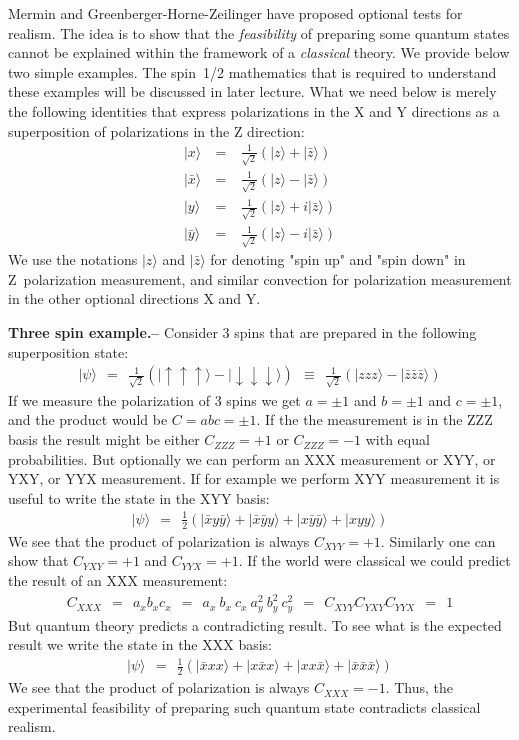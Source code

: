 \documentclass[onecolumn,fleqn, 11pt]{revtex4}
\newcommand{\beq}{\begin{eqnarray}}
\newcommand{\eeq}{\end{eqnarray}}
\begin{document}
Mermin and Greenberger-Horne-Zeilinger have proposed optional tests for realism.
The idea is to show that the {\em feasibility} of preparing some quantum states 
cannot be explained within the framework of a {\em classical} theory.
We provide below two simple examples. The spin~1/2 mathematics that is required 
to understand these examples will be discussed in later lecture. What we need 
below is merely the following identities that express polarizations 
in the X and Y directions as a superposition of polarizations in the Z direction:
\beq
| x \rangle \ &=& \ \frac{1}{\sqrt{2}}\left(| z \rangle + | \bar{z}\rangle\right) \\
| \bar{x} \rangle \ &=& \ \frac{1}{\sqrt{2}}\left(| z \rangle - | \bar{z}\rangle\right) \\
| y \rangle \ &=& \ \frac{1}{\sqrt{2}}\left(| z \rangle +i | \bar{z}\rangle\right) \\
| \bar{y} \rangle \ &=& \ \frac{1}{\sqrt{2}}\left(| z \rangle -i | \bar{z}\rangle\right)
\eeq
We use the notations $| z \rangle$ and  $| \bar{z} \rangle$ for denoting "spin up" 
and "spin down" in Z~polarization measurement, and similar convection 
for polarization measurement in the other optional directions X and Y.
 

{\bf Three spin example.-- } 
Consider 3 spins that are prepared in the following superposition state: 
\beq
|\psi\rangle \ \ = \ \ 
\frac{1}{\sqrt{2}}\left(|\uparrow\uparrow\uparrow\rangle - |\downarrow\downarrow\downarrow\rangle\right)
\ \ \equiv \ \ 
\frac{1}{\sqrt{2}}\left(| zzz \rangle - | \bar{z}\bar{z}\bar{z}\rangle\right)
\eeq
If we measure the polarization of 3 spins 
we get ${a=\pm1}$ and  ${b=\pm1}$ and ${c=\pm1}$, 
and the product would be ${C=abc=\pm1}$. 
If the the measurement is in the ZZZ basis 
the result might be either ${C_{ZZZ}=+1}$ or ${C_{ZZZ}=-1}$ 
with equal probabilities. 
But optionally we can perform an XXX measurement or XYY, 
or YXY, or YYX measurement. If for example we perform XYY measurement 
it is useful to write the state in the XYY basis:
\beq
|\psi\rangle \ \ = \ \ \frac{1}{2}\left(| \bar{x} y \bar{y} \rangle + | \bar{x} \bar{y} y \rangle + | x \bar{y} \bar{y} \rangle + | x y y \rangle\right)
\eeq 
We see that the product of polarization is always $C_{XYY}=+1$. 
Similarly one can show that $C_{YXY}=+1$ and $C_{YYX}=+1$.
If the world were classical we could predict the result 
of an XXX measurement:
\beq
C_{XXX} \ \ = \ \ a_xb_xc_x \ \ = \ \  a_x \ b_x \ c_x \ a_y^2 \ b_y^2 \ c_y^2 \ \ = \ \ C_{XYY}C_{YXY} C_{YYX} \ \ = \ \ 1
\eeq
But quantum theory predicts a contradicting result. 
To see what is the expected result we write the state in the XXX basis:  
\beq
|\psi\rangle \ \ = \ \ \frac{1}{2}\left(| \bar{x} x x \rangle + | x \bar{x} x \rangle + | x x \bar{x} \rangle + | \bar{x} \bar{x} \bar{x} \rangle\right)
\eeq 
We see that the product of polarization is always $C_{XXX}=-1$. 
Thus, the experimental feasibility of preparing such quantum state 
contradicts classical realism. 
     
\end{document}
